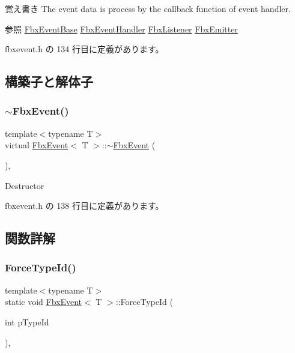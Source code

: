 \begin{DoxyNote}{覚え書き}
The event data is process by the callback function of event handler. 
\end{DoxyNote}
\begin{DoxySeeAlso}{参照}
\hyperlink{class_fbx_event_base}{Fbx\+Event\+Base} \hyperlink{class_fbx_event_handler}{Fbx\+Event\+Handler} \hyperlink{class_fbx_listener}{Fbx\+Listener} \hyperlink{class_fbx_emitter}{Fbx\+Emitter} 
\end{DoxySeeAlso}


 fbxevent.\+h の 134 行目に定義があります。



\subsection{構築子と解体子}
\mbox{\label{class_fbx_event_a57f0d84cc53c4d29bcff0dceb091eed4}} 
\subsubsection{\texorpdfstring{$\sim$\+Fbx\+Event()}{~FbxEvent()}}
{\footnotesize\ttfamily template$<$typename T$>$ \\
virtual \hyperlink{class_fbx_event}{Fbx\+Event}$<$ T $>$\+::$\sim$\hyperlink{class_fbx_event}{Fbx\+Event} (\begin{DoxyParamCaption}{ }\end{DoxyParamCaption})\hspace{0.3cm}{\ttfamily [inline]}, {\ttfamily [virtual]}}



Destructor 



 fbxevent.\+h の 138 行目に定義があります。



\subsection{関数詳解}
\mbox{\label{class_fbx_event_a0e3fe581649a5917208561a03ad61295}} 
\subsubsection{\texorpdfstring{Force\+Type\+Id()}{ForceTypeId()}}
{\footnotesize\ttfamily template$<$typename T$>$ \\
static void \hyperlink{class_fbx_event}{Fbx\+Event}$<$ T $>$\+::Force\+Type\+Id (\begin{DoxyParamCaption}\item[{int}]{p\+Type\+Id }\end{DoxyParamCaption})\hspace{0.3cm}{\ttfamily [inline]}, {\ttfamily [static]}}

